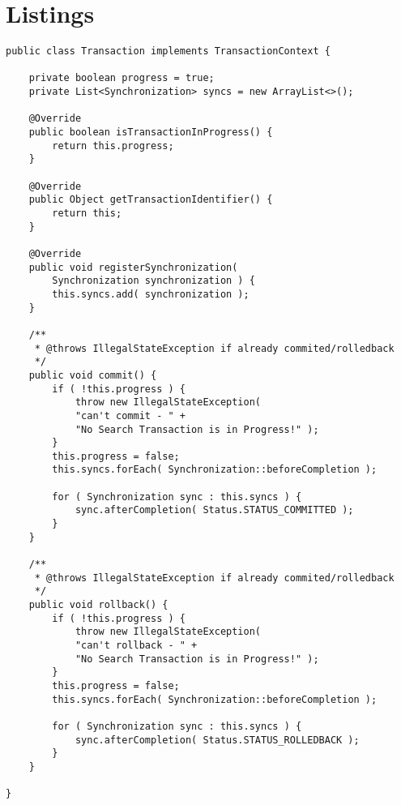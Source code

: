 \section*{Listings}

\lstset{language=java}
\begin{lstlisting}[frame=htrbl, caption={the simple Transaction contract}, label={lst:Transaction.java}]
public class Transaction implements TransactionContext {

	private boolean progress = true;
	private List<Synchronization> syncs = new ArrayList<>();
	
	@Override
	public boolean isTransactionInProgress() {
		return this.progress;
	}
	
	@Override
	public Object getTransactionIdentifier() {
		return this;
	}
	
	@Override
	public void registerSynchronization(
		Synchronization synchronization ) {
		this.syncs.add( synchronization );
	}
	
	/**
	 * @throws IllegalStateException if already commited/rolledback
	 */
	public void commit() {
		if ( !this.progress ) {
			throw new IllegalStateException( 
			"can't commit - " + 
			"No Search Transaction is in Progress!" );
		}
		this.progress = false;
		this.syncs.forEach( Synchronization::beforeCompletion );
		
		for ( Synchronization sync : this.syncs ) {
			sync.afterCompletion( Status.STATUS_COMMITTED );
		}
	}
	
	/**
	 * @throws IllegalStateException if already commited/rolledback
 	 */
	public void rollback() {
		if ( !this.progress ) {
			throw new IllegalStateException( 
			"can't rollback - " + 
			"No Search Transaction is in Progress!" );
		}
		this.progress = false;
		this.syncs.forEach( Synchronization::beforeCompletion );
	
		for ( Synchronization sync : this.syncs ) {
			sync.afterCompletion( Status.STATUS_ROLLEDBACK );
		}
	}

}
\end{lstlisting}

